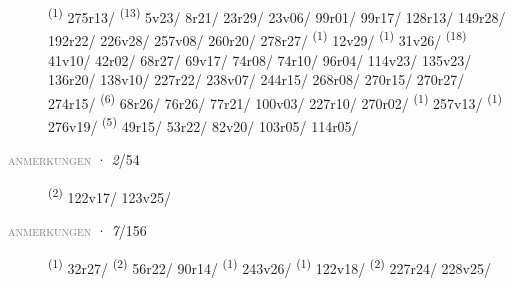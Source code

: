\begin{description}
    \item[]  \textsuperscript{(1)} \mbox{275r13/} \CASEBREAK {} \textsuperscript{(13)} \mbox{5v23/} \mbox{8r21/} \mbox{23r29/} \mbox{23v06/} \mbox{99r01/} \mbox{99r17/} \mbox{128r13/} \mbox{149r28/} \mbox{192r22/} \mbox{226v28/} \mbox{257v08/} \mbox{260r20/} \mbox{278r27/} \textsuperscript{(1)} \mbox{12v29/} \textsuperscript{(1)} \mbox{31v26/} \textsuperscript{(18)} \mbox{41v10/} \mbox{42r02/} \mbox{68r27/} \mbox{69v17/} \mbox{74r08/} \mbox{74r10/} \mbox{96r04/} \mbox{114v23/} \mbox{135v23/} \mbox{136r20/} \mbox{138v10/} \mbox{227r22/} \mbox{238v07/} \mbox{244r15/} \mbox{268r08/} \mbox{270r15/} \mbox{270r27/} \mbox{274r15/} \textsuperscript{(6)} \mbox{68r26/} \mbox{76r26/} \mbox{77r21/} \mbox{100v03/} \mbox{227r10/} \mbox{270r02/} \textsuperscript{(1)} \mbox{257v13/} \textsuperscript{(1)} \mbox{276v19/} \CASEBREAK {} \textsuperscript{(5)} \mbox{49r15/} \mbox{53r22/} \mbox{82v20/} \mbox{103r05/} \mbox{114r05/}
\end{description}
\textsc{\textcolor{gray}{anmerkungen}}
\ENTRYEND
\noindent{} · \textit{2}/54 \LEMMALINE
\begin{description}
    \item[]  \textsuperscript{(2)} \mbox{122v17/} \mbox{123v25/}
\end{description}
\textsc{\textcolor{gray}{anmerkungen}}
\ENTRYEND
\noindent{} · \textit{7}/156 \LEMMALINE
\begin{description}
    \item[]  \textsuperscript{(1)} \mbox{32r27/} \textsuperscript{(2)} \mbox{56r22/} \mbox{90r14/} \textsuperscript{(1)} \mbox{243v26/} \CASEBREAK {} \textsuperscript{(1)} \mbox{122v18/} \textsuperscript{(2)} \mbox{227r24/} \mbox{228v25/}
\end{description}
